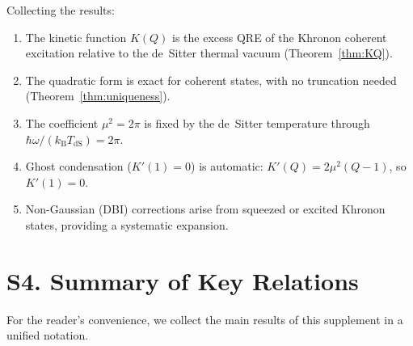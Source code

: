 \documentclass[letterpaper,twocolumn,superscriptaddress,longbibliography]{revtex4-2}
\newcommand{\kB}{k_{\mathrm{B}}}
\newcommand{\TdS}{T_{\mathrm{dS}}}
\begin{document}
Collecting the results:
\begin{enumerate}
  \item The kinetic function $K(Q)$ is the excess QRE of the
        Khronon coherent excitation relative to the de~Sitter
        thermal vacuum (Theorem~\ref{thm:KQ}).
  \item The quadratic form is exact for coherent states, with
        no truncation needed (Theorem~\ref{thm:uniqueness}).
  \item The coefficient $\mu^2 = 2\pi$ is fixed by the
        de~Sitter temperature through
        $\hbar\omega/(\kB\TdS) = 2\pi$.
  \item Ghost condensation ($K'(1) = 0$) is automatic:
        $K'(Q) = 2\mu^2(Q-1)$, so $K'(1) = 0$.
  \item Non-Gaussian (DBI) corrections arise from squeezed or
        excited Khronon states, providing a systematic expansion.
\end{enumerate}

\section{S4. Summary of Key Relations}
\label{sec:summary}

For the reader's convenience, we collect the main results of this
supplement in a unified notation.
\end{document}

